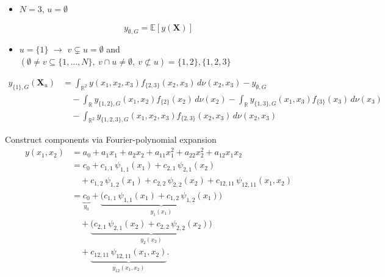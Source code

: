 \begin{frame}
    \begin{itemize}
    \item $N = 3$, $u = \emptyset$
  \end{itemize}
    \begin{equation*}
    y_{\emptyset,G} = \mathbb{E}[y(\boldsymbol{X})]
    \end{equation*}
    \begin{itemize}
      \item $u = \{1\}$ $\rightarrow$ $v \subsetneq u = \emptyset$ and $(\emptyset \ne v \subseteq \{1,\dots,N\},\ v \cap u \ne \emptyset,\ v \not\subset u) = \{1,2\}, \{1,2,3\}$
    \end{itemize}
    \begin{align*}
       y_{{\{1\}},G}(\boldsymbol{X}_u) &= \int_{\mathbb{R}^{2}} y(x_1, x_2, x_3) f_{{\{2, 3\}}}(x_2, x_3) \, d \nu(x_2, x_3) - y_{\emptyset,G} \\[1em]
    &\quad - \int_{\mathbb{R}}y_{{\{1, 2\}}, G}(x_1, x_2)f_{{\{2\}}}(x_2) \, d \nu(x_2) - \int_{\mathbb{R}}y_{{\{1, 3\}}, G}(x_1, x_3)f_{{\{3\}}}(x_3) \, d \nu(x_3) \\[1em]
    &\quad - \int_{\mathbb{R}^2}y_{{\{1, 2, 3\}}, G}(x_1, x_2, x_3)f_{{\{2, 3\}}}(x_2, x_3) \, d \nu(x_2, x_3)
    \end{align*}
  \end{frame}

\begin{frame}{Construct components via Fourier-polynomial expansion}
    \begin{align*}
y(x_1,x_2) 
&= a_0 + a_1 x_1 + a_2 x_2 
   + a_{11} x_1^2 + a_{22} x_2^2 + a_{12} x_1 x_2 \\[0.5em]
&= c_0 
   + c_{1,1}\,\psi_{1,1}(x_1) 
   + c_{2,1}\,\psi_{2,1}(x_2) \\[0.5em]
&\quad
   + c_{1,2}\,\psi_{1,2}(x_1)
   + c_{2,2}\,\psi_{2,2}(x_2)
   + c_{12,11}\,\psi_{12,11}(x_1,x_2) \\[0.5em]
&= 
   \underbrace{c_0}_{y_0}
   + \underbrace{\big(c_{1,1}\,\psi_{1,1}(x_1) 
                     + c_{1,2}\,\psi_{1,2}(x_1)\big)}_{y_1(x_1)} \\[0.5em]
&\quad
   + \underbrace{\big(c_{2,1}\,\psi_{2,1}(x_2) 
                     + c_{2,2}\,\psi_{2,2}(x_2)\big)}_{y_2(x_2)} \\[0.5em]
&\quad
   + \underbrace{c_{12,11}\,\psi_{12,11}(x_1,x_2)}_{y_{12}(x_1,x_2)}.
\end{align*}
\end{frame}

